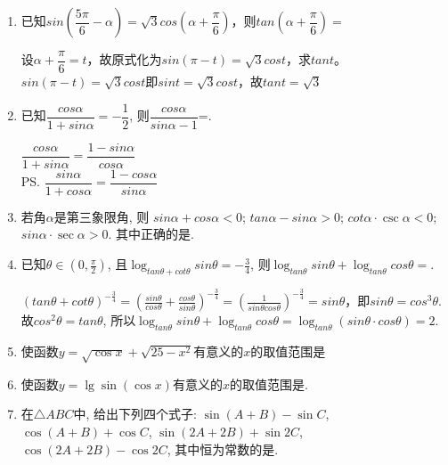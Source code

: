 \begin{enumerate}
\begin{jieda}
    \end{jieda}
    \item 已知$sin(\dfrac{5\pi}{6} - \alpha) = \sqrt{3}cos(\alpha + \dfrac{\pi}{6})$，则$tan(\alpha + \dfrac{\pi}{6}) = $ 
    \begin{jieda}
        设$\alpha + \dfrac{\pi}{6} = t$，故原式化为$sin(\pi - t) = \sqrt{3}cost$，求$tant$。\\
$sin(\pi - t) = \sqrt{3}cost$即$sint = \sqrt{3}cost$，故$tant = \sqrt{3}$
    \end{jieda}
    \item 已知$\dfrac{ cos\alpha}{1+ sin\alpha}=-\dfrac{1}{2}$, 则$\dfrac{ cos\alpha}{ sin\alpha-1}$=. 
    \begin{jieda}
    $\dfrac{ cos\alpha}{1+ sin\alpha}= \dfrac{1-sin\alpha}{cos\alpha}$ \\
    \ps $\dfrac{ sin\alpha}{1+ cos\alpha}= \dfrac{1-cos\alpha}{sin\alpha}$ 
    \end{jieda}
        \item 若角$\alpha$是第三象限角, 则
         $ sin\alpha+ cos\alpha<0$; 
         $ tan\alpha- sin\alpha>0$; 
         $ cot\alpha\cdot\csc\alpha<0$; 
         $ sin\alpha\cdot\sec\alpha>0$. 
        其中正确的是.
        \item 已知$\theta\in\left(0,\frac{\pi}{2}\right)$, 且$\log_{ tan\theta+ cot\theta} sin\theta=-\frac{3}{4}$, 
        则$\log_{ tan\theta} sin\theta + \log_{ tan\theta} cos\theta=$.
        \begin{jieda}
        $( tan\theta+ cot\theta)^{-\frac{3}{4}} =(\frac{sin\theta}{cos\theta} + \frac{cos\theta}{sin\theta})^{-\frac{3}{4}} = (\frac{1}{sin\theta cos\theta})^{-\frac{3}{4}} = sin\theta$，即$sin\theta = cos^3\theta$. 故$ cos^2\theta= tan\theta$, 所以$\log_{ tan\theta} sin\theta + \log_{ tan\theta} cos\theta = \log_{ tan\theta} (sin\theta \cdot cos\theta)=2$. 
        \end{jieda}
    \item 使函数$y=\sqrt{\cos x}+\sqrt{25-x^{2}}$有意义的$x$的取值范围是
    \item 使函数$y=\lg\sin(\cos{x})$有意义的$x$的取值范围是. 
    \item 在$\triangle{ABC}$中, 给出下列四个式子: 
     $\sin(A+B)-\sin{C}$, 
     $\cos(A+B)+\cos{C}$, 
     $\sin(2A+2B)+\sin2C$, 
     $\cos(2A+2B)-\cos2C$, 其中恒为常数的是.
\end{enumerate}
